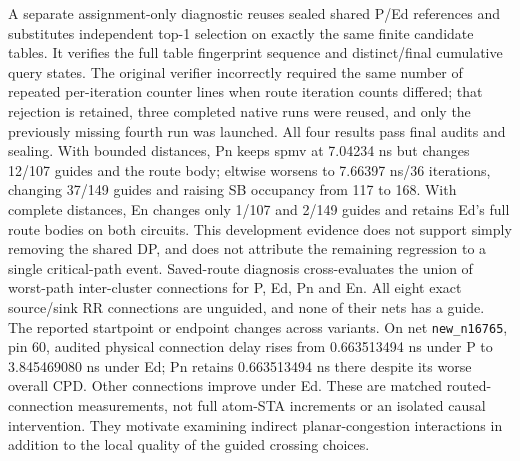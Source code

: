 \documentclass[conference,10pt]{IEEEtran}
\begin{document}
A separate assignment-only diagnostic reuses sealed shared P/Ed references and substitutes independent top-1 selection on exactly the same finite candidate tables. It verifies the full table fingerprint sequence and distinct/final cumulative query states. The original verifier incorrectly required the same number of repeated per-iteration counter lines when route iteration counts differed; that rejection is retained, three completed native runs were reused, and only the previously missing fourth run was launched. All four results pass final audits and sealing. With bounded distances, Pn keeps spmv at 7.04234 ns but changes 12/107 guides and the route body; eltwise worsens to 7.66397 ns/36 iterations, changing 37/149 guides and raising SB occupancy from 117 to 168. With complete distances, En changes only 1/107 and 2/149 guides and retains Ed's full route bodies on both circuits. This development evidence does not support simply removing the shared DP, and does not attribute the remaining regression to a single critical-path event.
Saved-route diagnosis cross-evaluates the union of worst-path inter-cluster connections for P, Ed, Pn and En. All eight exact source/sink RR connections are unguided, and none of their nets has a guide. The reported startpoint or endpoint changes across variants. On net \texttt{new\_n16765}, pin 60, audited physical connection delay rises from 0.663513494 ns under P to 3.845469080 ns under Ed; Pn retains 0.663513494 ns there despite its worse overall CPD. Other connections improve under Ed. These are matched routed-connection measurements, not full atom-STA increments or an isolated causal intervention. They motivate examining indirect planar-congestion interactions in addition to the local quality of the guided crossing choices.
\end{document}
